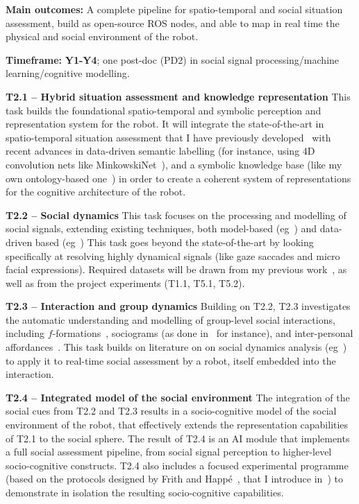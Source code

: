 \documentclass[11pt,a4paper]{report}
\begin{document}
\begin{framed}
    \textbf{Main outcomes:} A complete pipeline for spatio-temporal and social
    situation assessment, build as open-source ROS nodes, and able to map in
    real time the physical and social environment of the robot.

    \textbf{Timeframe:} \textbf{Y1-Y4}; one post-doc (PD2) in social
signal processing/machine learning/cognitive modelling.
\end{framed}

\textbf{T2.1 -- Hybrid situation assessment and knowledge representation} This
task builds the foundational spatio-temporal and symbolic perception and
representation system for the robot. It will integrate the state-of-the-art in
spatio-temporal situation assessment that I have previously
developed~\cite{lemaignan2018underworlds, sallami2019simulation} with recent
advances in data-driven semantic labelling (for instance, using 4D convolution
nets like MinkowskiNet~\cite{choy20194d}), and a symbolic knowledge base (like
my own ontology-based one~\cite{lemaignan2010oro}) in order to create a coherent
system of representations for the cognitive architecture of the robot.

\textbf{T2.2 -- Social dynamics} This task focuses on the processing and
modelling of social signals, extending existing techniques, both model-based
(eg~\cite{gunes2017automatic,lemaignan2016realtime,others}) and
data-driven based (eg~\cite{bartlett2019what}) This task goes beyond the state-of-the-art by
looking specifically at resolving highly dynamical signals (like gaze saccades
and micro facial expressions). Required datasets will be drawn from my previous
work~\cite{lemaignan2018pinsoro}, as well as from the project experiments (T1.1,
T5.1, T5.2).

\textbf{T2.3 -- Interaction and group dynamics} Building on T2.2, T2.3
investigates the automatic understanding and modelling of group-level social
interactions, including $f$-formations~\cite{marshall2011using}, sociograms (as
done in~\cite{garcia2016hybrid} for instance), and inter-personal
affordances~\cite{pandey2013affordance}. This task builds on literature on on
social dynamics analysis (eg~\cite{jermann2009physical, martinez2019collocated})
to apply it to real-time social assessment by a robot, itself embedded into the
interaction.

\textbf{T2.4 -- Integrated model of the social environment} The integration of
the social cues from T2.2 and T2.3 results in a socio-cognitive model of the
social environment of the robot, that effectively extends the representation
capabilities of T2.1 to the social sphere. The result of T2.4 is an AI module
that implements a full social assessment pipeline, from social signal perception
to higher-level socio-cognitive constructs. T2.4 also includes a
focused experimental programme (based on the protocols designed by Frith and
Happé~\cite{frith1994autism}, that I introduce in~\cite{lemaignan2015mutual}) to
demonstrate in isolation the resulting socio-cognitive capabilities.
\end{document}
